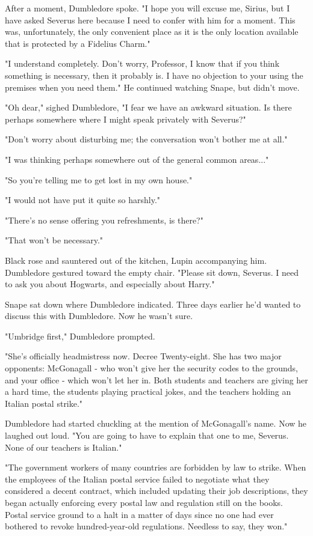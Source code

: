 After a moment, Dumbledore spoke. "I hope you will excuse me, Sirius, but I have asked Severus here because I need to confer with him for a moment. This was, unfortunately, the only convenient place as it is the only location available that is protected by a Fidelius Charm."

"I understand completely. Don't worry, Professor, I know that if you think something is necessary, then it probably is. I have no objection to your using the premises when you need them." He continued watching Snape, but didn't move.

"Oh dear," sighed Dumbledore, "I fear we have an awkward situation. Is there perhaps somewhere where I might speak privately with Severus?"

"Don't worry about disturbing me; the conversation won't bother me at all."

"I was thinking perhaps somewhere out of the general common areas..."

"So you're telling me to get lost in my own house."

"I would not have put it quite so harshly."

"There's no sense offering you refreshments, is there?"

"That won't be necessary."

Black rose and sauntered out of the kitchen, Lupin accompanying him. Dumbledore gestured toward the empty chair. "Please sit down, Severus. I need to ask you about Hogwarts, and especially about Harry."

Snape sat down where Dumbledore indicated. Three days earlier he'd wanted to discuss this with Dumbledore. Now he wasn't sure.

"Umbridge first," Dumbledore prompted.

"She's officially headmistress now. Decree Twenty-eight. She has two major opponents: McGonagall - who won't give her the security codes to the grounds, and your office - which won't let her in. Both students and teachers are giving her a hard time, the students playing practical jokes, and the teachers holding an Italian postal strike."

Dumbledore had started chuckling at the mention of McGonagall's name. Now he laughed out loud. "You are going to have to explain that one to me, Severus. None of our teachers is Italian."

"The government workers of many countries are forbidden by law to strike. When the employees of the Italian postal service failed to negotiate what they considered a decent contract, which included updating their job descriptions, they began actually enforcing every postal law and regulation still on the books. Postal service ground to a halt in a matter of days since no one had ever bothered to revoke hundred-year-old regulations. Needless to say, they won."

